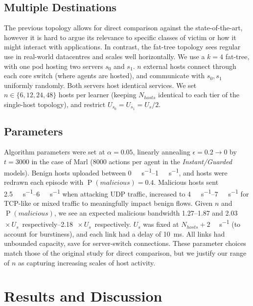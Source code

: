 \documentclass[10pt, times, conference, letterpaper]{IEEEtran}
\begin{document}
\subsection{Multiple Destinations}
The previous topology allows for direct comparison against the state-of-the-art, however it is hard to argue its relevance to specific classes of victim or how it might interact with applications.
In contrast, the fat-tree topology \cite{DBLP:conf/sigcomm/Al-FaresLV08} sees regular use in real-world datacentres and scales well horizontally.
We use a $k=4$ fat-tree, with one pod hosting two servers $s_0$ and $s_1$.
$n$ external hosts connect through each core switch (where agents are hosted), and communicate with $s_0, s_1$ uniformly randomly.
Both servers host identical services.
We set $n \in \{6, 12, 24, 48\}$ hosts per learner (keeping $N_{\mathit{hosts}}$ identical to each tier of the single-host topology), and restrict $U_{s_0} = U_{s_1} = U_s / 2$.

\subsection{Parameters}
Algorithm parameters were set at $\alpha=0.05$, linearly annealing $\epsilon=0.2 \rightarrow 0$ by $t=3000$ in the case of Marl (\num{8000} actions per agent in the \emph{Instant/Guarded} models).
Benign hosts uploaded between \SIrange{0}{1}{\mega\bit\per\second}, and hosts were redrawn each episode with $\operatorname{P}(\mathit{malicious})=0.4$.
Malicious hosts sent \SIrange{2.5}{6}{\mega\bit\per\second} when attacking UDP traffic, increased to \SIrange{4}{7}{\mega\bit\per\second} for TCP-like or mixed traffic to meaningfully impact benign flows.
Given $n$ and $\operatorname{P}(\mathit{malicious})$, we see an expected malicious bandwidth \numrange{1.27}{1.87} and \SIrange{2.03}{2.18}{$\! \times U_s$} respectively.
$U_s$ was fixed at $N_{\mathit{hosts}}+2$ \si{\mega\bit\per\second} (to account for burstiness), and each link had a delay of \SI{10}{\milli\second}.
All links had unbounded capacity, save for server-switch connections.
These parameter choices match those of the original study for direct comparison, but we justify our range of $n$ as capturing increasing scales of host activity.

\section{Results and Discussion}
\label{sec:the-results-of-doing-so}
\end{document}
